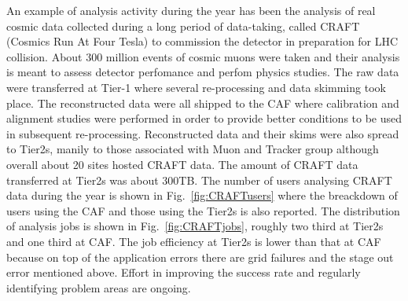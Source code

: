 An example of analysis activity during the year has been the analysis of real 
cosmic data collected during a long period of data-taking, called CRAFT (Cosmics Run At Four Tesla) to commission the detector in preparation for LHC collision. About 300 million events of cosmic muons were taken and their analysis is meant to assess detector perfomance and perfom physics studies.
The raw data were transferred at Tier-1 where several re-processing and data skimming took place. The reconstructed data were all shipped to the CAF where calibration and alignment studies were performed in order to provide better conditions to be used in subsequent re-processing. 
Reconstructed data and their skims were also spread to Tier2s, manily to 
those associated with Muon and Tracker group although overall about 20 sites hosted CRAFT data. The amount of CRAFT data transferred at Tier2s was about 300TB.
The number of users analysing CRAFT data during the year is shown in Fig.~\ref{fig:CRAFTusers} where the breackdown of users using the CAF and those using the Tier2s is also reported. The distribution of analysis jobs is shown in Fig.~\ref{fig:CRAFTjobs}, roughly two third at Tier2s and one third at CAF.
The job efficiency at Tier2s is lower than that at CAF because on top of the application errors there are grid failures and the stage out error mentioned above.
Effort in improving the success rate and regularly identifying problem areas are ongoing.
%
